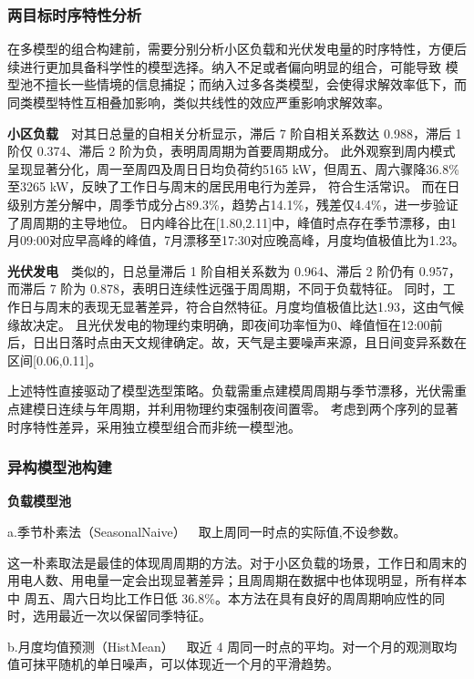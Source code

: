 \documentclass[zihao=-4,a4paper,fontset=none]{ctexart}
\begin{document}
\subsubsection{两目标时序特性分析}

在多模型的组合构建前，需要分别分析小区负载和光伏发电量的时序特性，方便后续进行更加具备科学性的模型选择。纳入不足或者偏向明显的组合，可能导致
模型池不擅长一些情境的信息捕捉；而纳入过多各类模型，会使得求解效率低下，而同类模型特性互相叠加影响，类似共线性的效应严重影响求解效率。

\textbf{小区负载}\ \ 对其日总量的自相关分析显示，滞后 7 阶自相关系数达 0.988，滞后 1 阶仅 0.374、滞后 2 阶为负，表明周周期为首要周期成分。
此外观察到周内模式呈现显著分化，周一至周四及周日日均负荷约5165 kW，但周五、周六骤降36.8\%至3265 kW，反映了工作日与周末的居民用电行为差异，
符合生活常识。
而在日级别方差分解中，周季节成分占89.3\%，趋势占14.1\%，残差仅4.4\%，进一步验证了周周期的主导地位。
日内峰谷比在[1.80,2.11]中，峰值时点存在季节漂移，由1月09:00对应早高峰的峰值，7月漂移至17:30对应晚高峰，月度均值极值比为1.23。

\textbf{光伏发电}\ \ 类似的，日总量滞后 1 阶自相关系数为 0.964、滞后 2 阶仍有 0.957，而滞后 7 阶为 0.878，表明日连续性远强于周周期，不同于负载特征。
同时，工作日与周末的表现无显著差异，符合自然特征。月度均值极值比达1.93，这由气候缘故决定。
且光伏发电的物理约束明确，即夜间功率恒为0、峰值恒在12:00前后，日出日落时点由天文规律确定。故，天气是主要噪声来源，且日间变异系数在区间[0.06,0.11]。

上述特性直接驱动了模型选型策略。负载需重点建模周周期与季节漂移，光伏需重点建模日连续与年周期，并利用物理约束强制夜间置零。
考虑到两个序列的显著时序特性差异，采用独立模型组合而非统一模型池。

\subsubsection{异构模型池构建}

\textbf{负载模型池}

a.季节朴素法（SeasonalNaive）\ \ 取上周同一时点的实际值,不设参数。

这一朴素取法是最佳的体现周周期的方法。对于小区负载的场景，工作日和周末的用电人数、用电量一定会出现显著差异；且周周期在数据中也体现明显，所有样本中
周五、周六日均比工作日低 36.8\%。本方法在具有良好的周周期响应性的同时，选用最近一次以保留同季特征。

b.月度均值预测（HistMean）\ \ 取近 4 周同一时点的平均。对一个月的观测取均值可抹平随机的单日噪声，可以体现近一个月的平滑趋势。
\end{document}
